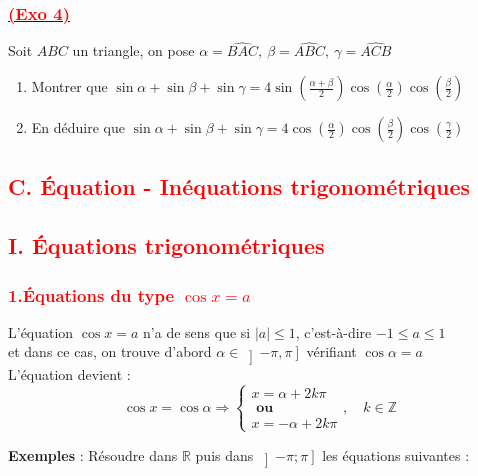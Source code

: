 \documentclass[a4paper,12pt]{article}
\begin{document}
\subsubsection*{\underline{\textcolor{red}{ (Exo 4)}}}
Soit \( ABC \) un triangle, on pose \( \alpha = \widehat{BAC},\ \beta = \widehat{ABC},\ \gamma = \widehat{ACB} \)

\begin{enumerate}
    \item Montrer que \( \sin \alpha + \sin \beta + \sin \gamma = 4 \sin\left(\frac{\alpha+\beta}{2}\right)\cos\left(\frac{\alpha}{2}\right)\cos\left(\frac{\beta}{2}\right) \)
    \item En déduire que \( \sin \alpha + \sin \beta + \sin \gamma = 4 \cos\left(\frac{\alpha}{2}\right)\cos\left(\frac{\beta}{2}\right)\cos\left(\frac{\gamma}{2}\right) \)
\end{enumerate}


\subsection*{\textcolor{red}{C. Équation - Inéquations trigonométriques}}

\subsection*{\textcolor{red}{I. Équations trigonométriques}}

\subsubsection*{\textcolor{red}{1.Équations du type $\cos x = a$}}

L’équation $\cos x = a$ n’a de sens que si $|a| \leq 1$, c’est-à-dire $-1 \leq a \leq 1$\\
et dans ce cas, on trouve d’abord $ \alpha \in \left]-\pi, \pi\right] $ vérifiant $\cos \alpha = a$\\
L’équation devient :\\

\[
\cos x = \cos \alpha \Rightarrow 
\left\{
\begin{array}{l}
x = \alpha + 2k\pi \\
\textbf{ ou }\\
x = -\alpha + 2k\pi
\end{array}
\right., \quad k \in \mathbb{Z}
\]

\textbf{Exemples} : Résoudre dans $\mathbb{R}$ puis dans $ \left] -\pi ; \pi \right] $ les équations suivantes :\\
\end{document}
